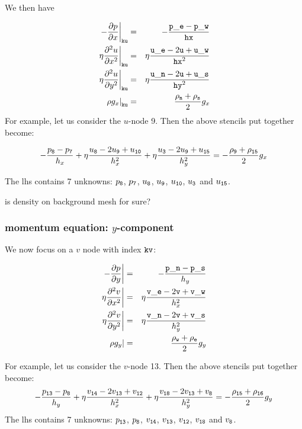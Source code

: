We then have

\begin{eqnarray}
\left. -\frac{\partial p}{\partial x} \right|_{\tt ku}
&=& -\frac{{\tt p\_e}-{\tt p\_w}}{\tt hx}       \nonumber\\
\left. \eta \frac{\partial^2 u}{\partial x^2} \right|_{\tt ku}
&=& \eta \frac{{\tt u\_e} -2{\tt u}+{\tt u\_w}}{{\tt hx}^2}  \nonumber\\
\left. \eta \frac{\partial^2 u}{\partial y^2} \right|_{\tt ku}
&=& \eta \frac{{\tt u\_n}-2{\tt u}+{\tt u\_s}}{{\tt hy}^2}  \nonumber\\
\left. \rho g_x \right|_{\tt ku} 
&=& \frac{\rho_{\tt n} + \rho_{\tt s}}{2} g_x   \nonumber
\end{eqnarray}
For example, let us consider the $u$-node 9. Then the above stencils put together become:

\[
-\frac{p_{\tt 8}-p_{\tt 7}}{h_x}       
+
\eta \frac{u_{\tt 8} -2u_{\tt 9}+u_{\tt 10}}{h_x^2}  
+ 
\eta \frac{u_{\tt 3}-2u_{\tt 9}+u_{\tt 15}}{h_y^2}  
= -
\frac{\rho_{\tt 9} + \rho_{\tt 15}}{2} g_x  
\]

The lhs contains 7 unknowns: $p_{\tt 8}$, $p_{\tt 7}$, $u_{\tt 8}$,
$u_{\tt 9}$, $u_{\tt 10}$, $u_{\tt 3}$ and $u_{\tt 15}$.

{\color{red} is density on background mesh for sure?}


\subsubsection{momentum equation: $y$-component}

We now focus on a $v$ node with index ${\tt kv}$:




\begin{eqnarray}
\left. -\frac{\partial p}{\partial y} \right|
&=& -\frac{{\tt p\_n}-{\tt p\_s}}{h_y}       \nonumber\\
\left. \eta \frac{\partial^2 v}{\partial x^2} \right|
&=& \eta \frac{{\tt v\_e} -2{\tt v}+{\tt v\_w}}{h_x^2}  \nonumber\\
\left. \eta \frac{\partial^2 v}{\partial y^2} \right|
&=& \eta \frac{{\tt v\_n} -2{\tt v}+{\tt v\_s}}{h_y^2}  \nonumber\\
\left. \rho g_y \right| 
&=& \frac{\rho_{\tt w} + \rho_{\tt e}}{2} g_y   \nonumber
\end{eqnarray}

For example, let us consider the $v$-node 13. Then the above stencils put together become:
\[
 -\frac{p_{\tt 13}-p_{\tt 8}}{h_y}       
+
\eta \frac{v_{\tt 14} -2v_{\tt 13}+v_{\tt 12}}{h_x^2} 
+
\eta \frac{v_{\tt 18} -2v_{\tt 13}+v_{\tt 8}}{h_y^2}  
= -
\frac{\rho_{\tt 15} + \rho_{\tt 16}}{2} g_y  
\]
The lhs contains 7 unknowns: $p_{\tt 13}$, $p_{\tt 8}$, $v_{\tt 14}$,
$v_{\tt 13}$, $v_{\tt 12}$, $v_{\tt 18}$ and $v_{\tt 8}$.



